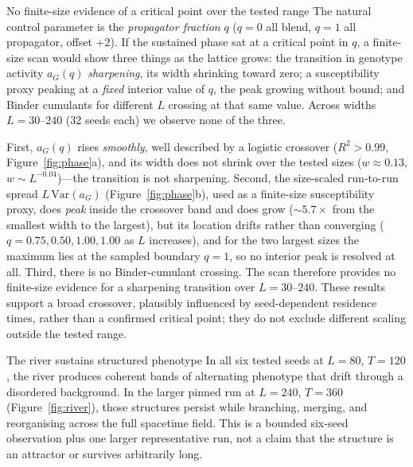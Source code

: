 \begin{empiricalfinding}[label={find:crossover}]{No finite-size evidence of a critical point over the tested range}
The natural control parameter is the \emph{propagator fraction} $q$ ($q = 0$ all
blend, $q = 1$ all propagator, offset $+2$). If the sustained phase sat at a
critical point in $q$, a finite-size scan would show three things as the lattice
grows: the transition in genotype activity $a_G(q)$ \emph{sharpening}, its width
shrinking toward zero; a susceptibility proxy peaking at a \emph{fixed} interior
value of $q$, the peak growing without bound; and Binder cumulants for different
$L$ crossing at that same value. Across widths $L = 30$--$240$ (32 seeds each)
we observe none of the three.

First, $a_G(q)$ rises \emph{smoothly}, well described by a logistic crossover
($R^2 > 0.99$, Figure~\ref{fig:phase}a), and its width does not shrink over the
tested sizes ($w \approx 0.13$, $w \sim L^{-0.04}$)---the transition is not
sharpening. Second, the size-scaled run-to-run spread $L\,\mathrm{Var}(a_G)$
(Figure~\ref{fig:phase}b), used as a finite-size susceptibility proxy, does
\emph{peak} inside the crossover band and does grow (${\sim}5.7\times$ from the
smallest width to the largest), but its location drifts rather than converging
($q=0.75,0.50,1.00,1.00$ as $L$ increases), and for the two largest sizes the
maximum lies at the sampled boundary $q=1$, so no interior peak is resolved at
all. Third, there is no Binder-cumulant crossing. The scan therefore provides no
finite-size evidence for a sharpening transition over $L=30$--$240$. These results support a broad crossover, plausibly
influenced by seed-dependent residence times, rather than a confirmed critical
point; they do not exclude different scaling outside the tested range.
\end{empiricalfinding}

\begin{empiricalfinding}[label={find:river}]{The river sustains structured phenotype}
In all six tested seeds at $L=80$, $T=120$, the river produces coherent bands
of alternating phenotype that drift through a disordered background. In the
larger pinned run at $L=240$, $T=360$ (Figure~\ref{fig:river}), those structures
persist while branching, merging, and reorganising across the full spacetime
field. This is a bounded six-seed observation plus one larger representative
run, not a claim that the structure is an attractor or survives arbitrarily
long.
\end{empiricalfinding}


